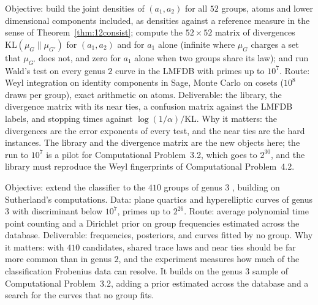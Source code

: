 \begin{compproblem}
Objective: build the joint densities of $(a_1,a_2)$ for all $52$ groups, atoms and lower dimensional components included, as densities against a reference measure in the sense of Theorem~\ref{thm:12consist}; compute the $52\times52$ matrix of divergences $\mathrm{KL}(\mu_G\|\mu_{G'})$ for $(a_1,a_2)$ and for $a_1$ alone (infinite where $\mu_G$ charges a set that $\mu_{G'}$ does not, and zero for $a_1$ alone when two groups share its law); and run Wald's test on every genus $2$ curve in the LMFDB \cite{lmfdb} with primes up to $10^7$. Route: Weyl integration on identity components in Sage, Monte Carlo on cosets ($10^8$ draws per group), exact arithmetic on atoms. Deliverable: the library, the divergence matrix with its near ties, a confusion matrix against the LMFDB labels, and stopping times against $\log(1/\alpha)/\mathrm{KL}$. Why it matters: the divergences are the error exponents of every test, and the near ties are the hard instances. The library and the divergence matrix are the new objects here; the run to $10^7$ is a pilot for Computational Problem~3.2, which goes to $2^{30}$, and the library must reproduce the Weyl fingerprints of Computational Problem~4.2.
\end{compproblem}

\begin{compproblem}
Objective: extend the classifier to the $410$ groups of genus $3$ \cite{fks2021}, building on Sutherland's computations. Data: plane quartics and hyperelliptic curves of genus $3$ with discriminant below $10^7$, primes up to $2^{26}$. Route: average polynomial time point counting \cite{harveysutherland2014} and a Dirichlet prior on group frequencies estimated across the database. Deliverable: frequencies, posteriors, and curves fitted by no group. Why it matters: with $410$ candidates, shared trace laws and near ties should be far more common than in genus $2$, and the experiment measures how much of the classification Frobenius data can resolve. It builds on the genus $3$ sample of Computational Problem~3.2, adding a prior estimated across the database and a search for the curves that no group fits.
\end{compproblem}
